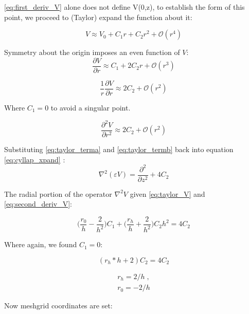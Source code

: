 \autoref{eq:first_deriv_V} alone does not define V(0,z), to establish the form of this point, we proceed to (Taylor) expand the function about it:

\begin{equation}\label{eq:taylor_V}
 V \approx V_0  + C_1 r +  C_2 r^{2} + \mathcal{O}(r^4) 
\end{equation}

Symmetry about the origin imposes an even function of $V$:  
$$ \frac{\partial V}{\partial r} \approx C_1 +  2 C_2 r  + \mathcal{O}(r^3) $$

\begin{equation}\label{eq:taylor_terma}
	\frac{1}{r} \frac{\partial V}{\partial r} \approx  2 C_2  + \mathcal{O}(r^2)
\end{equation}

Where $C_1 = 0$ to avoid a singular point.

\begin{equation}\label{eq:taylor_termb}
	\frac{\partial^2 V}{\partial r^2} \approx 2 C_2 + \mathcal{O}(r^2) 
\end{equation}

Substituting \autoref{eq:taylor_terma} and \autoref{eq:taylor_termb} back into equation \autoref{eq:cyllap_xpand} :
\begin{equation}
    \nabla^2 (\varepsilon V)= \frac{\partial^2}{\partial z^2} + 4 C_2 
\end{equation}

The radial portion of the operator $\nabla^2 V$ given \autoref{eq:taylor_V} and \autoref{eq:second_deriv_V}:

\begin{equation}
\bigg(\frac{r_0}{h} - \frac{2}{h^2} \bigg) C_1 + \bigg(\frac{r_h}{h} + \frac{2}{h^2} \bigg) C_2 h^2 = 4 C_2
\end{equation}

Where again, we found $C_1 = 0$:

$$
(r_h * h + 2) C_2 = 4 C_2
$$

\begin{equation}
    \begin{aligned}
	r_h = 2 / h  \; , \\
	r_0 = -2 / h
    \end{aligned}
\end{equation}

\newpage
Now meshgrid coordinates are set:

